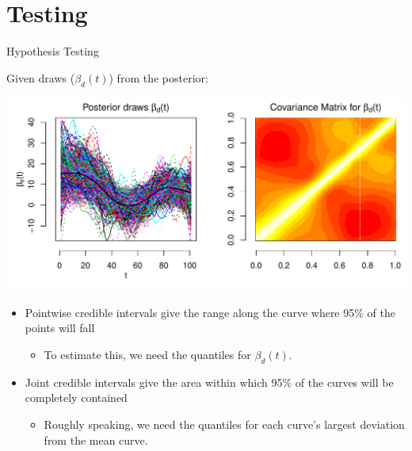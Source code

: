 \documentclass[9 pt]{beamer}
\newcommand{\bi}{\begin{itemize}}
\newcommand{\ei}{\end{itemize}}
\newcommand{\ilist}[1]{\bi \item #1 \ei}
\begin{document}
\section*{Testing}
\begin{frame}{Hypothesis Testing}


 Given draws ($\beta_d(t)$) from the posterior:


\includegraphics[scale=.5]{pics/Figure_BtDraws_&_Cov_C_35.pdf}
\vspace{-.5cm}
\bi
\item Pointwise credible intervals give the range along the curve where 95\% of the points will fall
 \ilist{To estimate this, we need the quantiles for $\beta_d(t)$.}
\item  Joint credible intervals give the area within which 95\% of the curves will be completely contained
\ilist{Roughly speaking, we need the quantiles for each curve's largest deviation from the mean curve.}
\ei

\end{frame}
\end{document}
